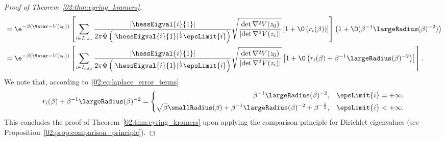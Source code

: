 \begin{proof}[Proof of Theorem~\ref{02:thm:eyring_kramers}]
\[\begin{aligned}
             &= \e^{-\beta(\Vstar-V(z_0))} \left[\sum_{i\in I_{\min}} \frac{|\hessEigval{i}{1}|}{2\pi\Phi\left(|\hessEigval{i}{1}|^{\frac12}\epsLimit{i}\right)}\sqrt{\frac{\det \nabla^2 V(z_0)}{\left|\det \nabla ^2 V(z_i)\right|}} \left[1 +\O\left(r_i(\beta)\right)\right]\right]\left(1+ \O(\beta^{-1}\largeRadius(\beta)^{-2})\right)\\
                &=\e^{-\beta(\Vstar-V(z_0))} \left[\sum_{i\in I_{\min}} \frac{|\hessEigval{i}{1}|}{2\pi\Phi\left(|\hessEigval{i}{1}|^{\frac12}\epsLimit{i}\right)}\sqrt{\frac{\det \nabla^2 V(z_0)}{\left|\det \nabla ^2 V(z_i)\right|}}\left[1+\O\left(r_i(\beta)+\beta^{-1}\largeRadius(\beta)^{-2}\right)\right]\right].
            \end{aligned}\]
        We note that, according to~\eqref{02:eq:laplace_error_terms}
        \[r_i(\beta)+\beta^{-1}\largeRadius(\beta)^{-2}=\left\{\begin{aligned}\beta^{-1}\largeRadius(\beta)^{-2},\quad&\epsLimit{i}=+\infty,\\
        \sqrt\beta\smallRadius(\beta)+\beta^{-1}\largeRadius(\beta)^{-2}+\beta^{-\frac12},\quad&\epsLimit{i}<+\infty.\end{aligned}\right.\]
        This concludes the proof of Theorem~\ref{02:thm:eyring_kramers} upon applying the comparison principle for Dirichlet eigenvalues (see Proposition~\ref{02:prop:comparison_principle}).
        \end{proof}


